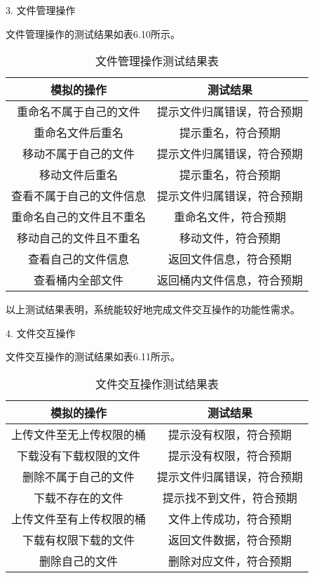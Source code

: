 3. 文件管理操作

文件管理操作的测试结果如表6.10所示。

\begin{table}[h]
  \centering
  \caption{文件管理操作测试结果表}
  \begin{tabular}{cc}
    \toprule
    模拟的操作   & 测试结果   \\
    \midrule
    重命名不属于自己的文件     & 提示文件归属错误，符合预期  \\
    重命名文件后重名          & 提示重名，符合预期     \\
    移动不属于自己的文件       & 提示文件归属错误，符合预期  \\
    移动文件后重名            & 提示重名，符合预期  \\
    查看不属于自己的文件信息   & 提示文件归属错误，符合预期     \\
    重命名自己的文件且不重名   & 重命名文件，符合预期  \\
    移动自己的文件且不重名     & 移动文件，符合预期     \\
    查看自己的文件信息        & 返回文件信息，符合预期  \\
    查看桶内全部文件          & 返回桶内文件信息，符合预期     \\
    \bottomrule
  \end{tabular}
\end{table}

以上测试结果表明，系统能较好地完成文件交互操作的功能性需求。

4. 文件交互操作

文件交互操作的测试结果如表6.11所示。

\begin{table}[h]
  \centering
  \caption{文件交互操作测试结果表}
  \begin{tabular}{cc}
    \toprule
    模拟的操作   & 测试结果   \\
    \midrule
    上传文件至无上传权限的桶   & 提示没有权限，符合预期  \\
    下载没有下载权限的文件     & 提示没有权限，符合预期  \\
    删除不属于自己的文件       & 提示文件归属错误，符合预期  \\
    下载不存在的文件          & 提示找不到文件，符合预期  \\
    上传文件至有上传权限的桶   & 文件上传成功，符合预期  \\
    下载有权限下载的文件       & 返回文件数据，符合预期  \\
    删除自己的文件            & 删除对应文件，符合预期  \\
    \bottomrule
  \end{tabular}
\end{table}

